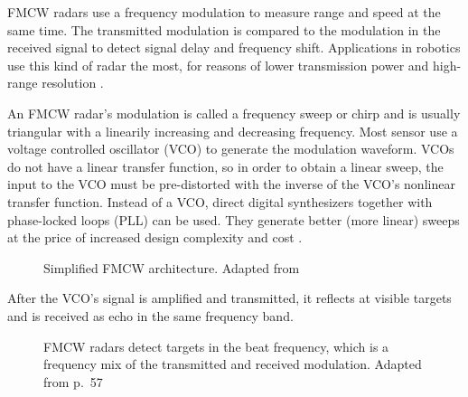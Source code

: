 FMCW radars use a frequency modulation to measure range and speed at the
same time. The transmitted modulation is compared to the modulation in
the received signal to detect signal delay and frequency shift.
Applications in robotics use this kind of radar the most, for reasons of
lower transmission power and high-range resolution \cite{Adams2012}.

An FMCW radar's modulation is called a frequency sweep or chirp and is
usually triangular with a linearily increasing and decreasing frequency.
Most sensor use a voltage controlled oscillator (VCO) to generate the
modulation waveform. VCOs do not have a linear transfer function, so in
order to obtain a linear sweep, the input to the VCO must be
pre-distorted with the inverse of the VCO's nonlinear transfer function.
Instead of a VCO, direct digital synthesizers together with phase-locked
loops (PLL) can be used. They generate better (more linear) sweeps at
the price of increased design complexity and cost \cite{Ernst2016}.

\begin{figure}[htp]
    \centering
    \def\svgwidth{\linewidth}
    
    \caption{\label{fig:fmcw_blocks}Simplified FMCW architecture. Adapted from \cite{VanZeijl2014}}
\end{figure}

After the VCO's signal is amplified and transmitted, it reflects at
visible targets and is received as echo in the same frequency band.

\begin{figure}[htp]
    \centering
    \def\svgwidth{10cm}
    
    \caption{\label{fig:fmcw_triangular}FMCW radars detect targets in the beat frequency, which is a frequency mix of the transmitted and received modulation. Adapted from \cite{Adams2012} p.~57}
\end{figure}

